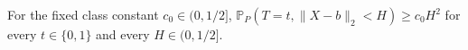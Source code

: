 For the fixed class constant \(c_0\in(0,1/2]\), \(\mathbb P_P(T=t,\lVert X-b\rVert_2<H)\geq c_0H^2\) for every \(t\in\{0,1\}\) and every \(H\in(0,1/2]\).